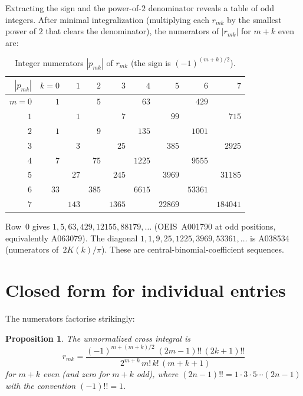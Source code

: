 \documentclass[11pt,a4paper]{article}
\newtheorem{proposition}[theorem]{Proposition}
\begin{document}
Extracting the sign and the power-of-$2$ denominator reveals a
table of odd integers. After minimal integralization (multiplying
each $r_{mk}$ by the smallest power of $2$ that clears the
denominator), the numerators of $|r_{mk}|$ for $m+k$ even are:

\begin{table}[ht]
\centering
\caption{Integer numerators $|p_{mk}|$ of $r_{mk}$ (the sign is
  $(-1)^{(m+k)/2}$).}
\label{tab:integers}
\small
\begin{tabular}{r|rrrrrrrr}
\toprule
$|p_{mk}|$ & $k{=}0$ & $1$ & $2$ & $3$ & $4$ & $5$ & $6$ & $7$ \\
\midrule
$m{=}0$ & $1$ && $5$ && $63$ && $429$ \\[2pt]
$1$ && $1$ && $7$ && $99$ && $715$ \\[2pt]
$2$ & $1$ && $9$ && $135$ && $1001$ \\[2pt]
$3$ && $3$ && $25$ && $385$ && $2925$ \\[2pt]
$4$ & $7$ && $75$ && $1225$ && $9555$ \\[2pt]
$5$ && $27$ && $245$ && $3969$ && $31185$ \\[2pt]
$6$ & $33$ && $385$ && $6615$ && $53361$ \\[2pt]
$7$ && $143$ && $1365$ && $22869$ && $184041$ \\
\bottomrule
\end{tabular}
\end{table}

Row~$0$ gives $1, 5, 63, 429, 12155, 88179, \ldots$
(OEIS~A001790 at odd positions, equivalently A063079).
The diagonal $1, 1, 9, 25, 1225, 3969, 53361, \ldots$
is A038534 (numerators of~$2K(k)/\pi$).
These are central-binomial-coefficient sequences.

\section{Closed form for individual entries}

The numerators factorise strikingly:

\begin{proposition}\label{prop:closed}
The unnormalized cross integral is
\[
  r_{mk} = \frac{(-1)^{m + (m+k)/2}\;
    (2m{-}1)!!\,(2k{+}1)!!}{2^{m+k}\,m!\,k!\,(m{+}k{+}1)}
\]
for $m+k$ even (and zero for $m+k$ odd), where
$(2n{-}1)!! = 1\cdot3\cdot5\cdots(2n{-}1)$ with the
convention $(-1)!! = 1$.
\end{proposition}
\end{document}
